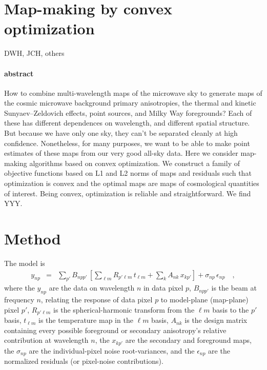 \documentclass[11pt]{article}
\begin{document}
\section*{Map-making by convex optimization}

\noindent
DWH, JCH, others

\paragraph{abstract}
How to combine multi-wavelength maps of the microwave sky to generate
maps of the cosmic microwave background primary anisotropies, the
thermal and kinetic Sunyaev--Zeldovich effects, point sources, and
Milky Way foregrounds?
Each of these has different dependences on wavelength, and different
spatial structure.
But because we have only one sky, they can't be separated cleanly at
high confidence.
Nonetheless, for many purposes, we want to be able to make point
estimates of these maps from our very good all-sky data.
Here we consider map-making algorithms based on convex optimization.
We construct a family of objective functions based on L1 and L2 norms
of maps and residuals such that optimization is convex and the optimal
maps are maps of cosmological quantities of interest.
Being convex, optimization is reliable and straightforward.
We find YYY.

\section{Method}

The model is
\begin{eqnarray}
  y_{np} &=& \sum_{p'} B_{npp'}\,\left[
      \sum_{\ell m} R_{p'\ell m}\,t_{\ell m}
    + \sum_{k} A_{nk}\,x_{kp'}\right] + \sigma_{np}\,\epsilon_{np} \quad ,
\end{eqnarray}
where the $y_{np}$ are the data on wavelength $n$ in data pixel $p$,
$B_{npp'}$ is the beam at frequency $n$, relating the response of data
pixel $p$ to model-plane (map-plane) pixel $p'$, $R_{p'\ell m}$ is the
spherical-harmonic transform from the $\ell m$ basis to the $p'$
basis, $t_{\ell m}$ is the temperature map in the $\ell m$ basis,
$A_{nk}$ is the design matrix containing every possible foreground or
secondary anisotropy's relative contribution at wavelength $n$, the
$x_{kp'}$ are the secondary and foreground maps, the $\sigma_{np}$ are
the individual-pixel noise root-variances, and the $\epsilon_{np}$ are
the normalized residuals (or pixel-noise contributions).
\end{document}
